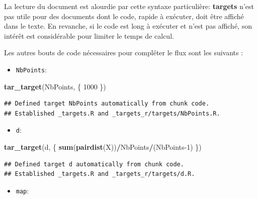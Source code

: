 \documentclass[
  12pt,
  french,
  a4paper,
  extrafontsizes,onecolumn,openright
  ]{memoir}
\newenvironment{Shaded}{\begin{snugshade}}{\end{snugshade}}
\newcommand{\DecValTok}[1]{\textcolor[rgb]{0.00,0.00,0.81}{#1}}
\newcommand{\KeywordTok}[1]{\textcolor[rgb]{0.13,0.29,0.53}{\textbf{#1}}}
\newcommand{\NormalTok}[1]{#1}
\newcommand{\OperatorTok}[1]{\textcolor[rgb]{0.81,0.36,0.00}{\textbf{#1}}}
\providecommand{\tightlist}{%
  \setlength{\itemsep}{0pt}\setlength{\parskip}{0pt}}
\begin{document}
La lecture du document est alourdie par cette syntaxe particulière: \textbf{targets} n'est pas utile pour des documents dont le code, rapide à exécuter, doit être affiché dans le texte.
En revanche, si le code est long à exécuter et n'est pas affiché, son intérêt est considérable pour limiter le temps de calcul.

Les autres bouts de code nécessaires pour compléter le flux sont les suivants :

\begin{itemize}
\tightlist
\item
  \texttt{NbPoints}:
\end{itemize}

\scriptsize

\begin{Shaded}
\begin{Highlighting}[]
\KeywordTok{tar_target}\NormalTok{(NbPoints, \{}
    \DecValTok{1000}
\NormalTok{\})}
\end{Highlighting}
\end{Shaded}

\begin{verbatim}
## Defined target NbPoints automatically from chunk code.
## Established _targets.R and _targets_r/targets/NbPoints.R.
\end{verbatim}

\normalsize

\begin{itemize}
\tightlist
\item
  \texttt{d}:
\end{itemize}

\scriptsize

\begin{Shaded}
\begin{Highlighting}[]
\KeywordTok{tar_target}\NormalTok{(d, \{}
    \KeywordTok{sum}\NormalTok{(}\KeywordTok{pairdist}\NormalTok{(X))}\OperatorTok{/}\NormalTok{NbPoints}\OperatorTok{/}\NormalTok{(NbPoints}\DecValTok{-1}\NormalTok{)}
\NormalTok{\})}
\end{Highlighting}
\end{Shaded}

\begin{verbatim}
## Defined target d automatically from chunk code.
## Established _targets.R and _targets_r/targets/d.R.
\end{verbatim}

\normalsize

\begin{itemize}
\tightlist
\item
  \texttt{map}:
\end{itemize}
\end{document}
